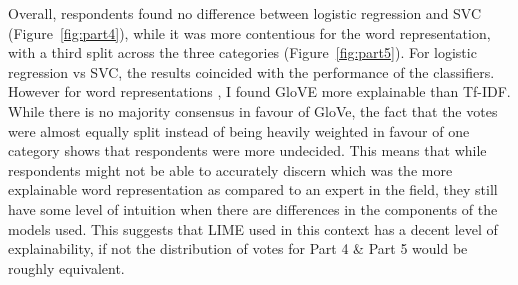 Overall, respondents found no difference between logistic regression and SVC (Figure~\ref{fig:part4}), while it was more contentious for the word representation, with a third split across the three categories (Figure~\ref{fig:part5}). For logistic regression vs SVC, the results coincided with the performance of the classifiers. However for word representations , I found GloVE more explainable than Tf-IDF. While there is no majority consensus in favour of GloVe, the fact that the votes were almost equally split instead of being heavily weighted in favour of one category shows that respondents were more undecided. This means that while respondents might not be able to accurately discern which was the more explainable word representation as compared to an expert in the field, they still have some level of intuition when there are differences in the components of the models used. This suggests that LIME used in this context has a decent level of explainability, if not the distribution of votes for Part 4 \& Part 5 would be roughly equivalent.

